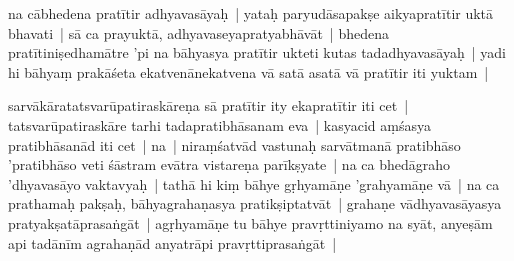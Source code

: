 \documentclass[article,12pt,a4paper]{memoir}%
\newcounter{parCount}
\begin{document}
	  
	  \pstart \leavevmode%
	na cābhedena pratītir adhyavasāyaḥ | yataḥ paryudāsapakṣe aikyapratītir uktā bhavati | sā ca prayuktā, adhyavaseyapratyabhāvāt | bhedena pratītiniṣedhamātre 'pi na bāhyasya pratītir ukteti kutas tadadhyavasāyaḥ | yadi hi bāhyaṃ prakāśeta ekatvenānekatvena vā satā asatā vā pratītir iti yuktam | 
	{}
	\pend%
      

	  
	  \pstart \leavevmode%
	\label{thakur75-134.31}sarvākāratatsvarūpatiraskāreṇa sā pratītir ity ekapratītir iti cet | tatsvarūpatiraskāre tarhi tadapratibhāsanam eva | kasyacid aṃśasya pratibhāsanād iti cet | na | niraṃśatvād vastunaḥ sarvātmanā pratibhāso 'pratibhāso veti śāstram evātra vistareṇa parīkṣyate | \label{thakur75-135.1} na ca bhedāgraho 'dhyavasāyo vaktavyaḥ | tathā hi kiṃ bāhye gṛhyamāṇe 'grahyamāṇe vā | na ca prathamaḥ pakṣaḥ, bāhyagrahaṇasya pratikṣiptatvāt | grahaṇe vādhyavasāyasya pratyakṣatāprasaṅgāt | agṛhyamāṇe tu bāhye pravṛttiniyamo na syāt, anyeṣām api tadānīm agrahaṇād anyatrāpi pravṛttiprasaṅgāt |
	{}
	\pend%
      
\end{document}
